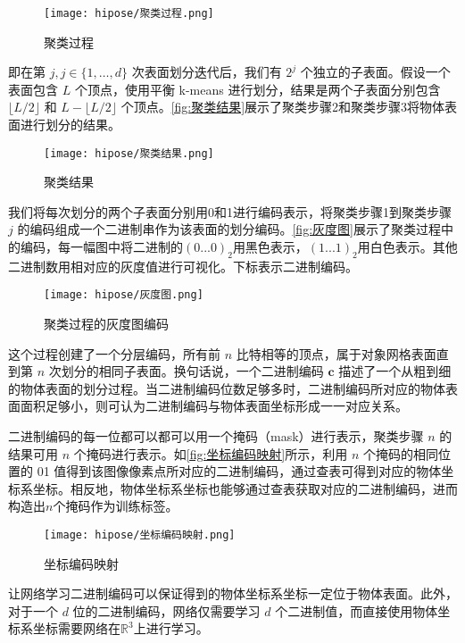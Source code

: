 \begin{figure}[htbp]
    \centering
    \texttt{[image: hipose/聚类过程.png]}
    \caption{聚类过程}
    \label{fig:聚类过程}
\end{figure}

即在第 $j, j \in \{1, \ldots, d\}$ 次表面划分迭代后，我们有 $2^{j}$ 个独立的子表面。假设一个表面包含 $L$ 个顶点，使用平衡 k-means 进行划分，结果是两个子表面分别包含 $\lfloor L/2 \rfloor$ 和 $L-\lfloor L/2 \rfloor$ 个顶点。\autoref{fig:聚类结果}展示了聚类步骤2和聚类步骤3将物体表面进行划分的结果。

\begin{figure}[htbp]
    \centering
    \texttt{[image: hipose/聚类结果.png]}
    \caption{聚类结果}
    \label{fig:聚类结果}
\end{figure}

我们将每次划分的两个子表面分别用0和1进行编码表示，将聚类步骤1到聚类步骤 $j$ 的编码组成一个二进制串作为该表面的划分编码。\autoref{fig:灰度图}展示了聚类过程中的编码，每一幅图中将二进制的$(0...0)_2$用黑色表示，$(1...1)_2$用白色表示。其他二进制数用相对应的灰度值进行可视化。下标表示二进制编码。

\begin{figure}[ht]
    \centering
    \texttt{[image: hipose/灰度图.png]}
    \caption{聚类过程的灰度图编码}
    \label{fig:灰度图}
\end{figure}

这个过程创建了一个分层编码，所有前 $n$ 比特相等的顶点，属于对象网格表面直到第 $n$ 次划分的相同子表面。换句话说，一个二进制编码 $\mathbf{c}$ 描述了一个从粗到细的物体表面的划分过程。当二进制编码位数足够多时，二进制编码所对应的物体表面面积足够小，则可认为二进制编码与物体表面坐标形成一一对应关系。

二进制编码的每一位都可以都可以用一个掩码（mask）进行表示，聚类步骤 $n$ 的结果可用 $n$ 个掩码进行表示。如\autoref{fig:坐标编码映射}所示，利用 $n$ 个掩码的相同位置的 01 值得到该图像像素点所对应的二进制编码，通过查表可得到对应的物体坐标系坐标。相反地，物体坐标系坐标也能够通过查表获取对应的二进制编码，进而构造出$n$个掩码作为训练标签。

\begin{figure}[ht]
    \centering
    \texttt{[image: hipose/坐标编码映射.png]}
    \caption{坐标编码映射}
    \label{fig:坐标编码映射}
\end{figure}

\par 让网络学习二进制编码可以保证得到的物体坐标系坐标一定位于物体表面。此外，对于一个 $d$ 位的二进制编码，网络仅需要学习 $d$ 个二进制值，而直接使用物体坐标系坐标需要网络在$\mathbb{R}^3$上进行学习。

